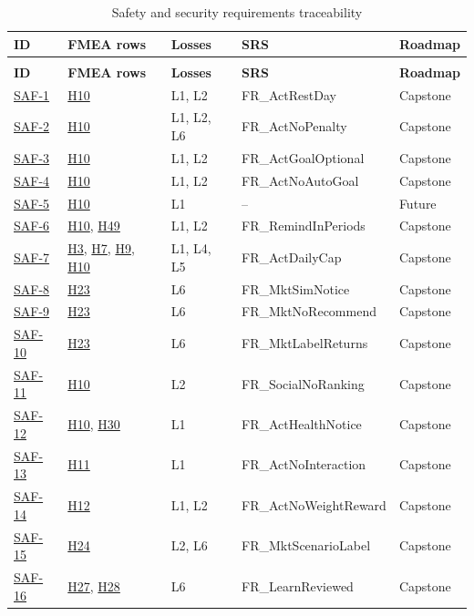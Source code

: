 \documentclass{article}
\newcommand{\reqref}[1]{\hyperref[req:#1]{#1}}
\newcommand{\hazref}[1]{\hyperref[#1]{#1}}
\begin{document}
{\small
\begin{longtable}{>{\raggedright\arraybackslash}p{}>{\raggedright\arraybackslash}p{}>{\raggedright\arraybackslash}p{}>{\raggedright\arraybackslash}p{}l}
\caption{Safety and security requirements traceability}
\label{TblSafetyTrace}\\
\toprule
\textbf{ID} & \textbf{FMEA rows} & \textbf{Losses} & \textbf{SRS} & \textbf{Roadmap}\\
\midrule
\endfirsthead
\multicolumn{5}{l}{\textit{Table~\ref{TblSafetyTrace} continued}}\\
\toprule
\textbf{ID} & \textbf{FMEA rows} & \textbf{Losses} & \textbf{SRS} & \textbf{Roadmap}\\
\midrule
\endhead
\bottomrule
\endfoot
\reqref{SAF-1} & \hazref{H10} & L1, L2 & FR\_ActRestDay & Capstone\\
\reqref{SAF-2} & \hazref{H10} & L1, L2, L6 & FR\_ActNoPenalty & Capstone\\
\reqref{SAF-3} & \hazref{H10} & L1, L2 & FR\_ActGoalOptional & Capstone\\
\reqref{SAF-4} & \hazref{H10} & L1, L2 & FR\_ActNoAutoGoal & Capstone\\
\reqref{SAF-5} & \hazref{H10} & L1 & -- & Future\\
\reqref{SAF-6} & \hazref{H10}, \hazref{H49} & L1, L2 & FR\_RemindInPeriods & Capstone\\
\reqref{SAF-7} & \hazref{H3}, \hazref{H7}, \hazref{H9}, \hazref{H10} & L1, L4, L5 & FR\_ActDailyCap & Capstone\\
\reqref{SAF-8} & \hazref{H23} & L6 & FR\_MktSimNotice & Capstone\\
\reqref{SAF-9} & \hazref{H23} & L6 & FR\_MktNoRecommend & Capstone\\
\reqref{SAF-10} & \hazref{H23} & L6 & FR\_MktLabelReturns & Capstone\\
\reqref{SAF-11} & \hazref{H10} & L2 & FR\_SocialNoRanking & Capstone\\
\reqref{SAF-12} & \hazref{H10}, \hazref{H30} & L1 & FR\_ActHealthNotice & Capstone\\
\reqref{SAF-13} & \hazref{H11} & L1 & FR\_ActNoInteraction & Capstone\\
\reqref{SAF-14} & \hazref{H12} & L1, L2 & FR\_ActNoWeightReward & Capstone\\
\reqref{SAF-15} & \hazref{H24} & L2, L6 & FR\_MktScenarioLabel & Capstone\\
\reqref{SAF-16} & \hazref{H27}, \hazref{H28} & L6 & FR\_LearnReviewed & Capstone\\

\end{longtable}}
\end{document}
